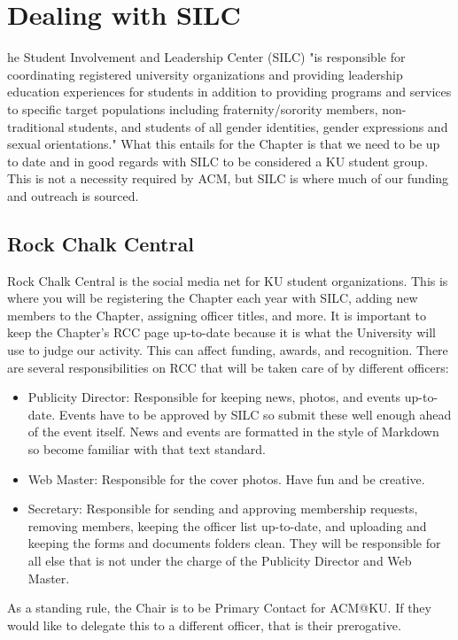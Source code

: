 %
%
\let\textcircled=\pgftextcircled
\chapter{Dealing with SILC}
\label{chap:silc}

he Student Involvement and Leadership Center (SILC) "is responsible
for coordinating registered university organizations and providing leadership
education experiences for students in addition to providing programs and
services to specific target populations including fraternity/sorority members,
non-traditional students, and students of all gender identities, gender
expressions and sexual orientations." What this entails for the Chapter is that
we need to be up to date and in good regards with SILC to be considered a KU
student group. This is not a necessity required by ACM, but SILC is where much
of our funding and outreach is sourced.


\section{Rock Chalk Central}
\label{sec:sec01}

Rock Chalk Central is the social media net for KU student organizations. This is
where you will be registering the Chapter each year with SILC, adding new
members to the Chapter, assigning officer titles, and more. It is important to
keep the Chapter's RCC page up-to-date because it is what the University will
use to judge our activity. This can affect funding, awards, and recognition.
There are several responsibilities on RCC that will be taken care of by
different officers:
\begin{itemize}
  \item Publicity Director: Responsible for keeping news, photos, and events
        up-to-date. Events have to be approved by SILC so submit these well
        enough ahead of the event itself. News and events are formatted in the
        style of Markdown so become familiar with that text standard.
  \item Web Master: Responsible for the cover photos. Have fun and be creative.
  \item Secretary: Responsible for sending and approving membership requests,
        removing members, keeping the officer list up-to-date, and uploading and
        keeping the forms and documents folders clean. They will be responsible
        for all else that is not under the charge of the Publicity Director and
        Web Master.
\end{itemize}
As a standing rule, the Chair is to be Primary Contact for ACM@KU. If they would
like to delegate this to a different officer, that is their prerogative.

